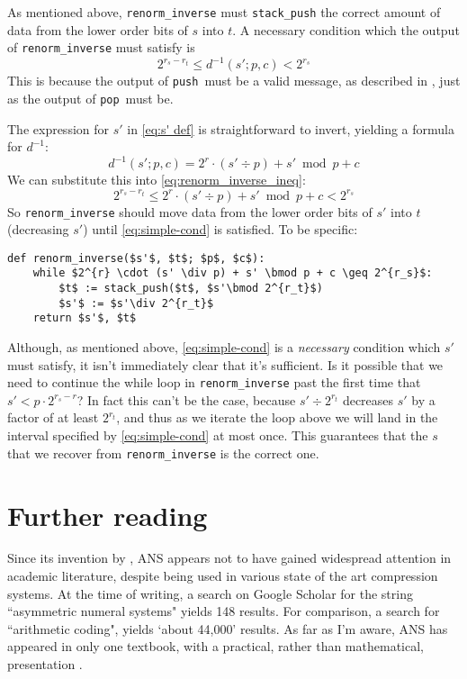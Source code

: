 \documentclass{article}
\theoremstyle{definition}
\newcommand{\push}{\texttt{push}}
\newcommand{\pop}{\texttt{pop}}
\begin{document}
As mentioned above, \texttt{renorm\_inverse} must \texttt{stack\_push} the
correct amount of data from the lower order bits of \(s\) into \(t\). A
necessary condition which the output of \texttt{renorm\_inverse} must satisfy
is
\begin{equation}\label{eq:renorm_inverse_ineq}
  2^{r_s - r_t} \leq d^{-1}(s'; p, c) < 2^{r_s}
\end{equation}
This is because the output of \push\ must be a valid message, as described in
, just as the output of \pop\ must be.

The expression for \(s'\) in \cref{eq:s' def} is straightforward to invert,
yielding a formula for
\(d^{-1}\):
\begin{equation}
  d^{-1}(s'; p, c) = 2^{r} \cdot (s' \div p) + s' \bmod p + c
\end{equation}
We can substitute this into \cref{eq:renorm_inverse_ineq}:
\begin{equation}
  2^{r_s - r_t} \leq 2^{r} \cdot (s' \div p) + s' \bmod p + c < 2^{r_s}\label{eq:simple-cond}
\end{equation}
So \texttt{renorm\_inverse} should move data from the lower order bits of
\(s'\) into \(t\) (decreasing \(s'\)) until \cref{eq:simple-cond} is satisfied.
To be specific:

\begin{lstlisting}[frame=single]
def renorm_inverse($s'$, $t$; $p$, $c$):
    while $2^{r} \cdot (s' \div p) + s' \bmod p + c \geq 2^{r_s}$:
        $t$ := stack_push($t$, $s'\bmod 2^{r_t}$)
        $s'$ := $s'\div 2^{r_t}$
    return $s'$, $t$
\end{lstlisting}

Although, as mentioned above, \cref{eq:simple-cond} is a \emph{necessary}
condition which \(s'\) must satisfy, it isn't immediately clear that it's
sufficient. Is it possible that we need to continue the while loop in
\texttt{renorm\_inverse} past the first time that \(s'<p\cdot2^{r_s - r}\)? In
fact this can't be the case, because \(s'\div2^{r_t}\) decreases \(s'\) by a
factor of at least \(2^{r_t}\), and thus as we iterate the loop above we will
land in the interval specified by \cref{eq:simple-cond} at most once. This
guarantees that the \(s\) that we recover from \texttt{renorm\_inverse} is the
correct one.

\section{Further reading}
Since its invention by \citet{duda2009}, ANS appears not to have gained
widespread attention in academic literature, despite being used in various
state of the art compression systems. At the time of writing, a search on
Google Scholar for the string ``asymmetric numeral systems" yields 148 results.
For comparison, a search for ``arithmetic coding", yields `about 44,000'
results. As far as I'm aware, ANS has appeared in only one textbook, with a
practical, rather than mathematical, presentation \citep{mcanlis2016}.
\end{document}
